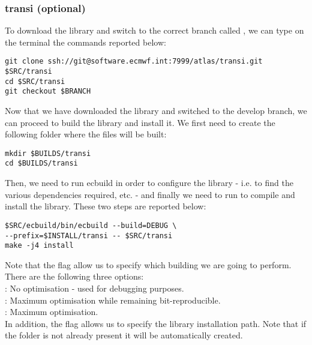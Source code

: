 \subsubsection{transi (optional)}
To download the library and switch to the correct branch called 
, we can type on the terminal the commands reported 
below:
%
\begin{lstlisting}[style=BashStyle]
git clone ssh://git@software.ecmwf.int:7999/atlas/transi.git $SRC/transi
cd $SRC/transi
git checkout $BRANCH
\end{lstlisting}
%
Now that we have downloaded the library and switched 
to the develop branch, we can proceed to build the 
library and install it. We first need to create the 
following folder where the files will be built:
%
\begin{lstlisting}[style=BashStyle]
mkdir $BUILDS/transi
cd $BUILDS/transi
\end{lstlisting}
%
Then, we need to run ecbuild in order to configure the 
library - i.e. to find the various dependencies required, 
etc. - and finally we need to run  
to compile and install the library. These two steps are 
reported below:
%
\begin{lstlisting}[style=BashStyle]
$SRC/ecbuild/bin/ecbuild --build=DEBUG \ 
--prefix=$INSTALL/transi -- $SRC/transi
make -j4 install
\end{lstlisting}
%
Note that the flag  allow us to specify which 
building we are going to perform. There are the following 
three options:\\
\hspace{1cm}: No optimisation - used 
for debugging purposes.\\
\hspace{1cm}: Maximum optimisation while 
remaining bit-reproducible.\\
\hspace{1cm}: Maximum optimisation.\\
In addition, the flag  allows us to 
specify the library installation path. Note that if 
the folder  is not already 
present it will be automatically created.




